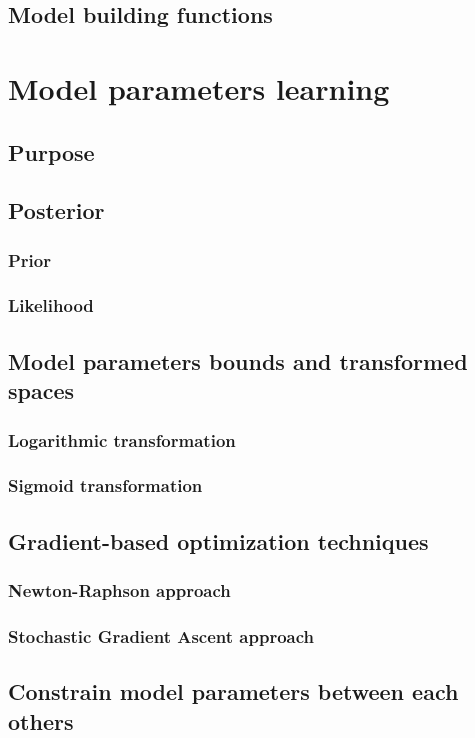 \documentclass{book}
\begin{document}
\section{Model building functions}
\newpage

\chapter{Model parameters learning}
\section{Purpose}
\section{Posterior}
\subsection{Prior}
\subsection{Likelihood}
\section{Model parameters bounds and transformed spaces}
\subsection{Logarithmic transformation}
\subsection{Sigmoid transformation}
\section{Gradient-based optimization techniques}
\subsection{Newton-Raphson approach}
\subsection{Stochastic Gradient Ascent approach}
\section{Constrain model parameters between each others}
\end{document}
